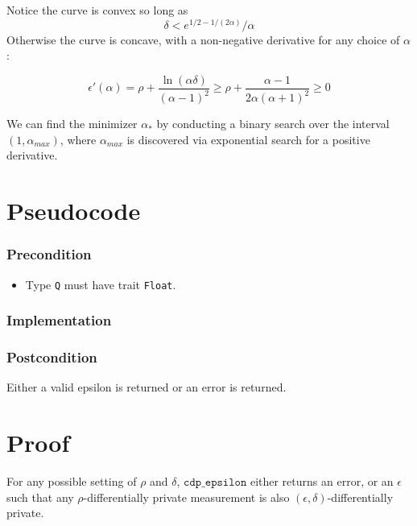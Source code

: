 Notice the curve is convex so long as 
\begin{equation}
    \delta < e^{1/2 - 1/(2\alpha)}/\alpha
\end{equation}
Otherwise the curve is concave, with a non-negative derivative for any choice of $\alpha$: 

\begin{equation}
    \epsilon'(\alpha) = \rho + \frac{\ln(\alpha\delta)}{(\alpha - 1)^2} 
    \geq \rho + \frac{\alpha - 1}{2\alpha (\alpha + 1)^2} 
    \geq 0
\end{equation}

We can find the minimizer $\alpha_{*}$ by conducting a binary search over the interval $(1, \alpha_{max})$, where $\alpha_{max}$ is discovered via exponential search for a positive derivative.


\section{Pseudocode}
\subsubsection*{Precondition}

\begin{itemize}
    \item Type \texttt{Q} must have trait \texttt{Float}.
\end{itemize}

\subsubsection*{Implementation}        


\subsubsection*{Postcondition}
Either a valid epsilon is returned or an error is returned.

\section{Proof}

\begin{theorem}
For any possible setting of $\rho$ and $\delta$, $\texttt{cdp\_epsilon}$ either returns an error, or an $\epsilon$ such that any $\rho$-differentially private measurement is also $(\epsilon, \delta)$-differentially private.
\end{theorem}

